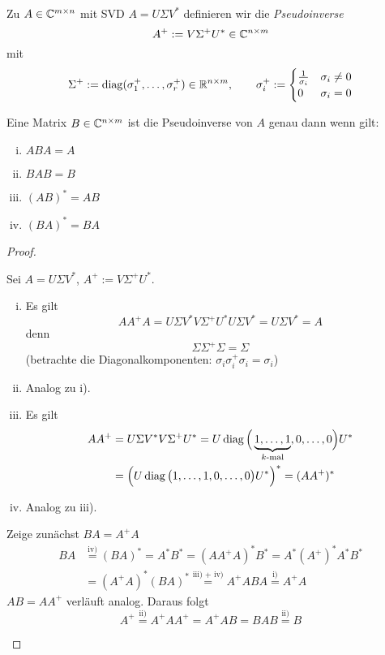 \documentclass[
]{mycourse}
\begin{document}
\begin{df}[Pseudoinverse]
	\label{1.39}	
	Zu $A\in \mathbb{C}^{m\times n}$ mit SVD $A=U\Sigma V^*$ definieren wir die \emph{Pseudoinverse}
	\[
		A^+ := V \Sigma^+ U^* \in \mathbb{C}^{n\times m}
	\]
	mit
	\[
		\Sigma^+ := \diag(\sigma_1^+,\dotsc, \sigma_r^+) \in \R^{n\times m}
		,\qquad \sigma_i^+ := \begin{cases}
			\f 1{\sigma_i}	& \sigma_i \neq 0 \\
			0 & \sigma_i = 0
		\end{cases}
	\]
\end{df}

\begin{st}
	\label{1.40}
	Eine Matrix $B\in \mathbb{C}^{n\times m}$ ist die Pseudoinverse von $A$ genau dann wenn gilt:
	\begin{enumerate}[i)]
		\item
			$ABA = A$
		\item
			$BAB = B$
		\item
			$(AB)^* = AB$
		\item
			$(BA)^* = BA$
	\end{enumerate}
	\begin{proof}
		\begin{seg}
			Sei $A=U\Sigma V^*$, $A^+ := V\Sigma^+U^*$.
			\begin{enumerate}[i)]
				\item
					Es gilt
					\[
						AA^+A = U\Sigma V^* V \Sigma^+ U^* U \Sigma V^* = U\Sigma V^* = A
					\]
					denn
					\[
						\Sigma \Sigma^+ \Sigma = \Sigma
					\]
					(betrachte die Diagonalkomponenten: $\sigma_i \sigma_i^+ \sigma_i = \sigma_i$)
				\item
					Analog zu i).
				\item
					Es gilt
					\begin{align*}
						AA^+ &= U \Sigma V^* V \Sigma^+ U^* = U \operatorname{diag}\Big(\underbrace{1,\dotsc,1}_{k\text{-mal}},0,\dotsc, 0\Big) U^*\\ &= \Big(U \operatorname{diag}\big(1,\dotsc,1,0,\dotsc,0\big) U^*\Big)^* = (AA^+)^*
					\end{align*}
				\item
					Analog zu iii).
			\end{enumerate}
		\end{seg}
		\begin{seg}[$B$ erfüllt die Bedingungen $\implies$ $B=A^+$] 
			Zeige zunächst $BA=A^+A$
			\begin{align*}
				BA &\stackrel{\text{iv)}}= (BA)^* = A^*B^* = (AA^+A)^*B^* = A^*(A^+)^*A^*B^*\\ &= (A^+A)^*(BA)^* \stackrel{\text{iii) + iv)}}= A^+ABA \stackrel{\text{i)}} = A^+A
			\end{align*}
			$AB=AA^+$ verläuft analog.
			Daraus folgt
			\[
				A^+ \stackrel{\text{ii)}}= A^+AA^+ = A^+AB = BAB \stackrel{\text{ii)}}= B 
			\]
		\end{seg}
	\end{proof}
\end{st}
\end{document}
